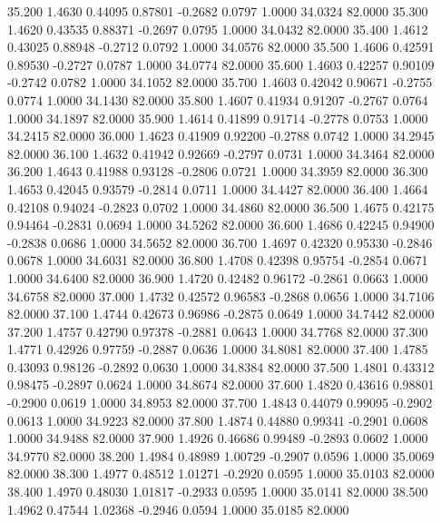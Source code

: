   35.200   1.4630   0.44095   0.87801  -0.2682   0.0797   1.0000  34.0324  82.0000
  35.300   1.4620   0.43535   0.88371  -0.2697   0.0795   1.0000  34.0432  82.0000
  35.400   1.4612   0.43025   0.88948  -0.2712   0.0792   1.0000  34.0576  82.0000
  35.500   1.4606   0.42591   0.89530  -0.2727   0.0787   1.0000  34.0774  82.0000
  35.600   1.4603   0.42257   0.90109  -0.2742   0.0782   1.0000  34.1052  82.0000
  35.700   1.4603   0.42042   0.90671  -0.2755   0.0774   1.0000  34.1430  82.0000
  35.800   1.4607   0.41934   0.91207  -0.2767   0.0764   1.0000  34.1897  82.0000
  35.900   1.4614   0.41899   0.91714  -0.2778   0.0753   1.0000  34.2415  82.0000
  36.000   1.4623   0.41909   0.92200  -0.2788   0.0742   1.0000  34.2945  82.0000
  36.100   1.4632   0.41942   0.92669  -0.2797   0.0731   1.0000  34.3464  82.0000
  36.200   1.4643   0.41988   0.93128  -0.2806   0.0721   1.0000  34.3959  82.0000
  36.300   1.4653   0.42045   0.93579  -0.2814   0.0711   1.0000  34.4427  82.0000
  36.400   1.4664   0.42108   0.94024  -0.2823   0.0702   1.0000  34.4860  82.0000
  36.500   1.4675   0.42175   0.94464  -0.2831   0.0694   1.0000  34.5262  82.0000
  36.600   1.4686   0.42245   0.94900  -0.2838   0.0686   1.0000  34.5652  82.0000
  36.700   1.4697   0.42320   0.95330  -0.2846   0.0678   1.0000  34.6031  82.0000
  36.800   1.4708   0.42398   0.95754  -0.2854   0.0671   1.0000  34.6400  82.0000
  36.900   1.4720   0.42482   0.96172  -0.2861   0.0663   1.0000  34.6758  82.0000
  37.000   1.4732   0.42572   0.96583  -0.2868   0.0656   1.0000  34.7106  82.0000
  37.100   1.4744   0.42673   0.96986  -0.2875   0.0649   1.0000  34.7442  82.0000
  37.200   1.4757   0.42790   0.97378  -0.2881   0.0643   1.0000  34.7768  82.0000
  37.300   1.4771   0.42926   0.97759  -0.2887   0.0636   1.0000  34.8081  82.0000
  37.400   1.4785   0.43093   0.98126  -0.2892   0.0630   1.0000  34.8384  82.0000
  37.500   1.4801   0.43312   0.98475  -0.2897   0.0624   1.0000  34.8674  82.0000
  37.600   1.4820   0.43616   0.98801  -0.2900   0.0619   1.0000  34.8953  82.0000
  37.700   1.4843   0.44079   0.99095  -0.2902   0.0613   1.0000  34.9223  82.0000
  37.800   1.4874   0.44880   0.99341  -0.2901   0.0608   1.0000  34.9488  82.0000
  37.900   1.4926   0.46686   0.99489  -0.2893   0.0602   1.0000  34.9770  82.0000
  38.200   1.4984   0.48989   1.00729  -0.2907   0.0596   1.0000  35.0069  82.0000
  38.300   1.4977   0.48512   1.01271  -0.2920   0.0595   1.0000  35.0103  82.0000
  38.400   1.4970   0.48030   1.01817  -0.2933   0.0595   1.0000  35.0141  82.0000
  38.500   1.4962   0.47544   1.02368  -0.2946   0.0594   1.0000  35.0185  82.0000
